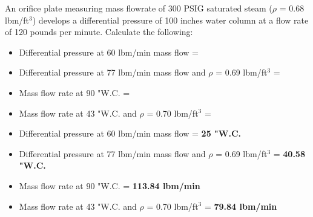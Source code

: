 
An orifice plate measuring mass flowrate of 300 PSIG saturated steam ($\rho$ = 0.68 lbm/ft$^{3}$) develops a differential pressure of 100 inches water column at a flow rate of 120 pounds per minute.  Calculate the following:

\begin{itemize}
\item{} Differential pressure at 60 lbm/min mass flow = \underbar{\hskip 50pt}
\vskip 5pt
\item{} Differential pressure at 77 lbm/min mass flow and $\rho$ = 0.69 lbm/ft$^{3}$ = \underbar{\hskip 50pt}
\vskip 5pt
\item{} Mass flow rate at 90 "W.C. = \underbar{\hskip 50pt}
\vskip 5pt
\item{} Mass flow rate at 43 "W.C. and $\rho$ = 0.70 lbm/ft$^{3}$ = \underbar{\hskip 50pt}
\end{itemize}







\begin{itemize}
\item{} Differential pressure at 60 lbm/min mass flow = {\bf 25 "W.C. }
\item{} Differential pressure at 77 lbm/min mass flow and $\rho$ = 0.69 lbm/ft$^{3}$ = {\bf 40.58 "W.C.}
\item{} Mass flow rate at 90 "W.C. = {\bf 113.84 lbm/min}
\item{} Mass flow rate at 43 "W.C. and $\rho$ = 0.70 lbm/ft$^{3}$ = {\bf 79.84 lbm/min}
\end{itemize}










